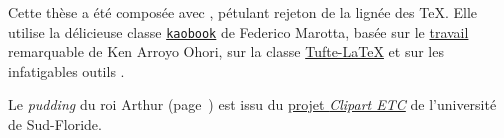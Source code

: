 \vspace*{\fill}

\begin{center}
	Cette thèse a été composée avec \href{https://tug.org/xetex/}{\XeLaTeX}, pétulant rejeton de la lignée des \TeX. Elle utilise la délicieuse classe \href{https://github.com/fmarotta/kaobook}{\texttt{kaobook}} de Federico Marotta, basée sur le \href{https://github.com/kenohori/thesis}{travail} remarquable de Ken Arroyo Ohori, sur la classe \href{https://github.com/Tufte-LaTeX/tufte-latex}{Tufte-\LaTeX} et sur les infatigables outils \href{https://komascript.de/}{\KOMAScript}.
	
	Le \emph{pudding} du roi Arthur (page~\pageref{img:pudding1}) est issu du \href{https://etc.usf.edu/clipart/}{projet \emph{Clipart ETC}} de l'université de Sud-Floride.
\end{center}